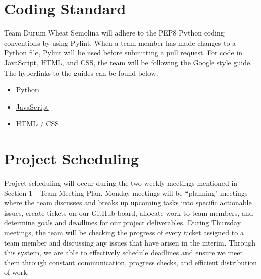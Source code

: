 \documentclass{article}
\begin{document}
\section{Coding Standard}
Team Durum Wheat Semolina will adhere to the PEP8 Python coding conventions by using Pylint. When a team member has made changes to a Python file, Pylint will be used before submitting a pull request. For code in JavaScript, HTML, and CSS, the team will be following the Google style guide. The hyperlinks to the guides can be found below:
\begin{itemize}
	\item \href{https://peps.python.org/pep-0008/}{Python}
	\item \href{https://google.github.io/styleguide/jsguide.html}{JavaScript}
	\item \href{https://google.github.io/styleguide/htmlcssguide.html}{HTML / CSS}
\end{itemize}

\section{Project Scheduling}

Project scheduling will occur during the two weekly meetings mentioned in Section 1 - Team Meeting Plan. Monday meetings will be ``planning" meetings where the team discusses and breaks up upcoming tasks into specific actionable issues, create tickets on our GitHub board, allocate work to team members, and determine goals and deadlines for our project deliverables. During Thursday meetings, the team will be checking the progress of every ticket assigned to a team member and discussing any issues that have arisen in the interim. Through this system, we are able to effectively schedule deadlines and ensure we meet them through constant communication, progress checks, and efficient distribution of work.
\end{document}
